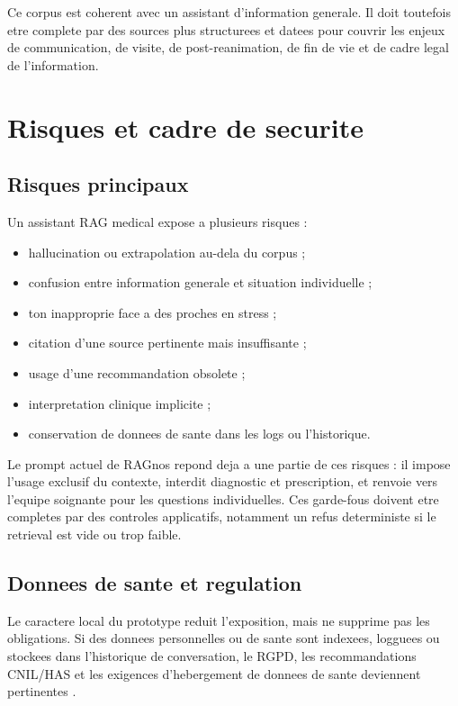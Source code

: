 \documentclass[11pt,a4paper]{article}
\begin{document}
Ce corpus est coherent avec un assistant d'information generale. Il doit toutefois etre complete par des sources plus structurees et datees pour couvrir les enjeux de communication, de visite, de post-reanimation, de fin de vie et de cadre legal de l'information.

\section{Risques et cadre de securite}

\subsection{Risques principaux}

Un assistant RAG medical expose a plusieurs risques :

\begin{itemize}
  \item hallucination ou extrapolation au-dela du corpus ;
  \item confusion entre information generale et situation individuelle ;
  \item ton inapproprie face a des proches en stress ;
  \item citation d'une source pertinente mais insuffisante ;
  \item usage d'une recommandation obsolete ;
  \item interpretation clinique implicite ;
  \item conservation de donnees de sante dans les logs ou l'historique.
\end{itemize}

Le prompt actuel de RAGnos repond deja a une partie de ces risques : il impose l'usage exclusif du contexte, interdit diagnostic et prescription, et renvoie vers l'equipe soignante pour les questions individuelles. Ces garde-fous doivent etre completes par des controles applicatifs, notamment un refus deterministe si le retrieval est vide ou trop faible.

\subsection{Donnees de sante et regulation}

Le caractere local du prototype reduit l'exposition, mais ne supprime pas les obligations. Si des donnees personnelles ou de sante sont indexees, logguees ou stockees dans l'historique de conversation, le RGPD, les recommandations CNIL/HAS et les exigences d'hebergement de donnees de sante deviennent pertinentes \autocite{cnilIARGPD,hasCnilGuideIA,hdsMinistere}.
\end{document}
